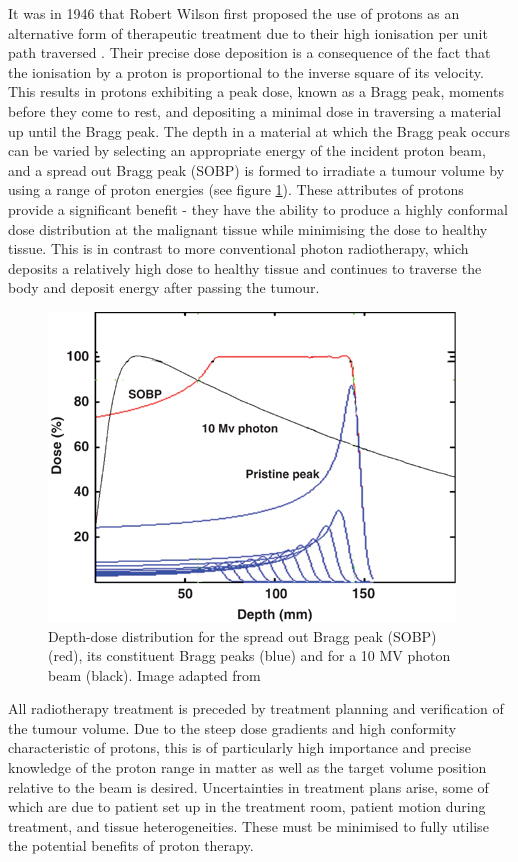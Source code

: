 \documentclass[11pt,a4paper]{article}
\begin{document}
It was in 1946 that Robert Wilson first proposed the use of protons as an alternative form of therapeutic treatment due to their high ionisation per unit path traversed \cite{wilson1946radiological}. Their precise dose deposition is a consequence of the fact that the ionisation by a proton is proportional to the inverse square of its velocity. This results in protons exhibiting a peak dose, known as a Bragg peak, moments before they come to rest, and depositing a minimal dose in traversing a material up until the Bragg peak. The depth in a material at which the Bragg peak occurs can be varied by selecting an appropriate energy of the incident proton beam, and a spread out Bragg peak (SOBP) is formed to irradiate a tumour volume by using a range of proton energies (see figure \ref{fig:braggpeak}). These attributes of protons provide a significant benefit - they have the ability to produce a highly conformal dose distribution at the malignant tissue while minimising the dose to healthy tissue. This is in contrast to more conventional photon radiotherapy, which deposits a relatively high dose to healthy tissue and continues to traverse the body and deposit energy after passing the tumour.
\begin{figure}[h]
\centering
\includegraphics[scale=1]{img/braggpeak.jpg}
\caption{Depth-dose distribution for the spread out Bragg peak (SOBP) (red), its constituent Bragg peaks (blue) and for a 10 MV photon beam (black). Image adapted from \cite{levin2005proton}}
\label{fig:braggpeak}
\end{figure}

All radiotherapy treatment is preceded by treatment planning and verification of the tumour volume. Due to the steep dose gradients and high conformity characteristic of protons, this is of particularly high importance and precise knowledge of the proton range in matter as well as the target volume position relative to the beam is desired. Uncertainties in treatment plans arise, some of which are due to patient set up in the treatment room, patient motion during treatment, and tissue heterogeneities. These must be minimised to fully utilise the potential benefits of proton therapy. 
\end{document}
